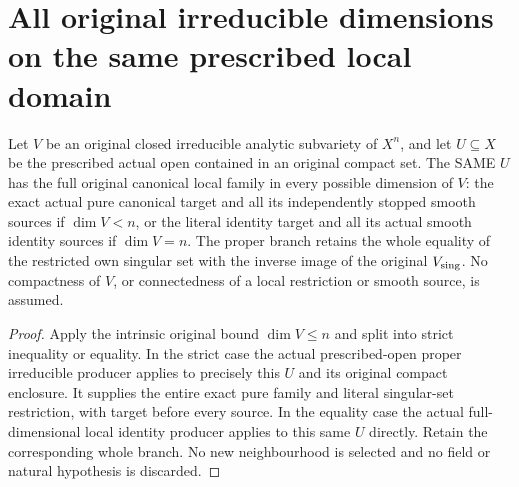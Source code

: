 \section{All original irreducible dimensions on the same prescribed local domain}

\begin{theorem}
\label{hir:original-prescribed-local-all-dimension-irreducible-family}
\leanok
Let $V$ be an original closed irreducible analytic subvariety of $X^n$,
and let $U\subseteq X$ be the prescribed actual open contained in an
original compact set. The SAME $U$ has the full original canonical
local family in every possible dimension of $V$: the exact actual
pure canonical target and all its independently stopped smooth sources
if $\dim V<n$, or the literal identity target and all its actual
smooth identity sources if $\dim V=n$. The proper branch retains the
whole equality of the restricted own singular set with the inverse
image of the original $V_{\rm sing}$. No compactness of $V$, or
connectedness of a local restriction or smooth source, is assumed.
\end{theorem}
\begin{proof}
Apply the intrinsic original bound $\dim V\le n$ and split into strict
inequality or equality. In the strict case the actual prescribed-open
proper irreducible producer applies to precisely this $U$ and its
original compact enclosure. It supplies the entire exact pure family
and literal singular-set restriction, with target before every source.
In the equality case the actual full-dimensional local identity
producer applies to this same $U$ directly. Retain the corresponding
whole branch. No new neighbourhood is selected and no field or natural
hypothesis is discarded.
\end{proof}
